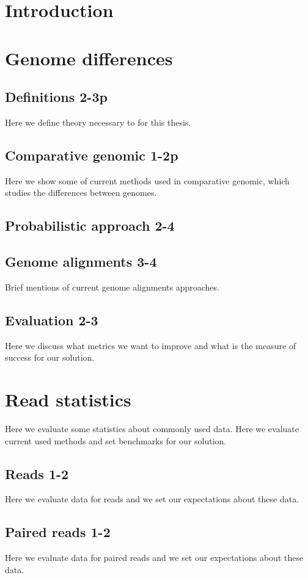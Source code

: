 \chapter*{Introduction}


\chapter{Genome differences}
\section{Definitions 2-3p}
Here we define theory necessary to for this thesis.
\section{Comparative genomic 1-2p}
Here we show some of current methods used in comparative genomic, which studies the differences between genomes.
\section{Probabilistic approach 2-4}

\section{Genome alignments 3-4}
Brief mentions of current genome alignments approaches.
\section{Evaluation 2-3}
Here we discuss what metrics we want to improve and what is the measure of success for our solution.

\chapter{Read statistics}
Here we evaluate some statistics about commonly used data.
Here we evaluate current used methods and set benchmarks for our solution.
\section{Reads 1-2}
Here we evaluate data for reads and we set our expectations about these data.
\section{Paired reads 1-2}
Here we evaluate data for paired reads and we set our expectations about these data.
